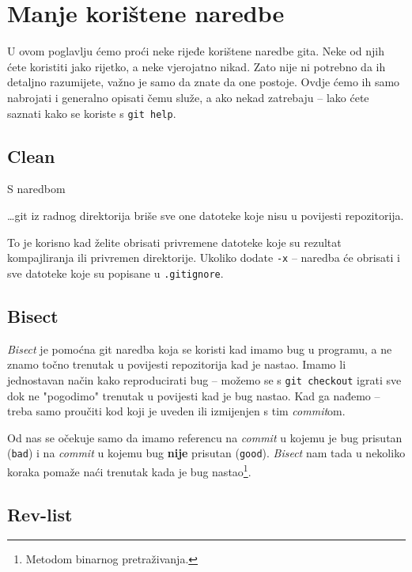 \chapter*{Manje korištene naredbe}

U ovom poglavlju ćemo proći neke rijeđe korištene naredbe gita.
Neke od njih ćete koristiti jako rijetko, a neke vjerojatno nikad.
Zato nije ni potrebno da ih detaljno razumijete, važno je samo da znate da one postoje. 
Ovdje ćemo ih samo nabrojati i generalno opisati čemu služe, a ako nekad zatrebaju -- lako ćete saznati kako se koriste s \verb+git help+.

\section*{Clean}

S naredbom\do\TODO


\dots{}git iz radnog direktorija briše sve one datoteke koje nisu u povijesti repozitorija.

To je korisno kad želite obrisati privremene datoteke koje su rezultat kompajliranja ili privremen direktorije.
Ukoliko dodate \verb+-x+ -- naredba će obrisati i sve datoteke koje su popisane u \verb+.gitignore+.

\section*{Bisect}

\emph{Bisect} je pomoćna git naredba koja se koristi kad imamo bug u programu, a ne znamo točno trenutak u povijesti repozitorija kad je nastao.
Imamo li jednostavan način kako reproducirati bug -- možemo se s \verb+git checkout+ igrati sve dok ne "pogodimo" trenutak u povijesti kad je bug nastao. 
Kad ga nađemo -- treba samo proučiti kod koji je uveden ili izmijenjen s tim \emph{commit}om.

Od nas se očekuje samo da imamo referencu na \emph{commit} u kojemu je bug prisutan (\verb+bad+) i na \emph{commit} u kojemu bug \textbf{nije} prisutan (\verb+good+).
\emph{Bisect} nam tada u nekoliko koraka pomaže naći trenutak kada je bug nastao\footnote{Metodom binarnog pretraživanja.}.

\section*{Rev-list}

